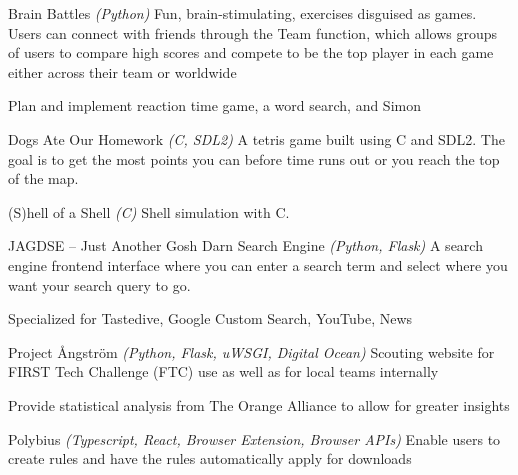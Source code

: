 \begin{cventries}
\cventryproject
    {Brain Battles} %
    {\emph{(Python)}}
    {} %
    {Fun, brain-stimulating, exercises disguised as games. Users can connect with friends through the Team function, which allows groups of users to compare high scores and compete to be the top player in each game either across their team or worldwide} %
    {
      \begin{cvitems} %
        \item {Plan and implement reaction time game, a word search, and Simon}
      \end{cvitems}
    }

\cventryproject
    {Dogs Ate Our Homework} %
    {\emph{(C, SDL2)}}
    {} %
    {A tetris game built using C and SDL2. The goal is to get the most points you can before time runs out or you reach the top of the map.} %
    {}

\cventryproject
    {(S)hell of a Shell} %
    {\emph{(C)}}
    {} %
    {Shell simulation with C.} %
    {}

\cventryproject
    {JAGDSE -- Just Another Gosh Darn Search Engine} %
    {\emph{(Python, Flask)}}
    {} %
    {A search engine frontend interface where you can enter a search term and select where you want your search query to go.} %
    {
      \begin{cvitems} %
        \item {Specialized for Tastedive, Google Custom Search, YouTube, News}
      \end{cvitems}
    }

\cventryproject
    {Project Ångström} %
    {\emph{(Python, Flask, uWSGI, Digital Ocean)}}
    {} %
    {Scouting website for FIRST Tech Challenge (FTC) use as well as for local teams internally} %
    {
      \begin{cvitems} %
        \item {Provide statistical analysis from The Orange Alliance to allow for greater insights}
      \end{cvitems}
    }

\cventryproject
    {Polybius} %
    {\emph{(Typescript, React, Browser Extension, Browser APIs)}}
    {} %
    {Enable users to create rules and have the rules automatically apply for downloads} %
    {}
\end{cventries}

